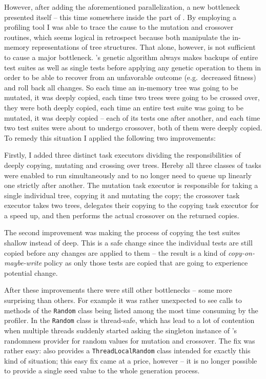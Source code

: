 However, after adding the aforementioned parallelization, a new bottleneck presented itself -- this time 
somewhere inside the \java part of \xmlmate. By employing a \java profiling tool I was able to trace the cause 
to the mutation and crossover routines, which seems logical in retrospect because both manipulate the 
in-memory representations of \xml tree structures. That alone, however, is not sufficient to cause a 
major bottleneck. \evosuite's genetic algorithm always makes backups of entire test suites as well as 
single tests before applying any genetic operation to them in order to be able to recover from an 
unfavorable outcome (e.g.\ decreased fitness) and roll back all changes. So each time an in-memory \xml 
tree was going to be mutated, it was deeply copied, each time two \xml trees were going to be crossed 
over, they were both deeply copied, each time an entire test suite was going to be mutated, it was 
deeply copied -- each of its tests one after another, and each time two test suites were about to 
undergo crossover, both of them were deeply copied. To remedy this situation I applied the following two
improvements:

Firstly, I added three distinct task executors dividing the responsibilities of deeply copying, mutating
and crossing over \xml trees. Hereby all three classes of tasks were enabled to run simultaneously 
and to no longer need to queue up linearly one strictly after another. The mutation task executor is 
responsible for taking a single individual \xml tree, copying it and mutating the copy; the 
crossover task executor takes two \xml trees, delegates their copying to the copying task executor 
for a speed up, and then performs the actual crossover on the returned copies.

The second improvement was making the process of copying the test suites shallow instead of deep. 
This is a safe change since the individual tests are still copied before any changes are applied 
to them -- the result is a kind of \emph{copy-on-maybe-write} policy as only those tests are copied 
that are going to experience potential change.

After these improvements there were still other bottlenecks -- some more surprising than others. For example 
it was rather unexpected to see calls to methods of the \texttt{Random} class being listed among the most time
consuming by the profiler. In  the \texttt{Random} class is thread-safe, which has lead to a lot of 
contention when multiple threads suddenly started asking the singleton instance of \evosuite's randomness 
provider for random values for mutation and crossover. The fix was rather easy:  also provides 
a \texttt{ThreadLocalRandom} class intended for exactly this kind of situation; this easy fix came 
at a price, however -- it is no longer possible to provide a single seed value to the whole generation 
process.

